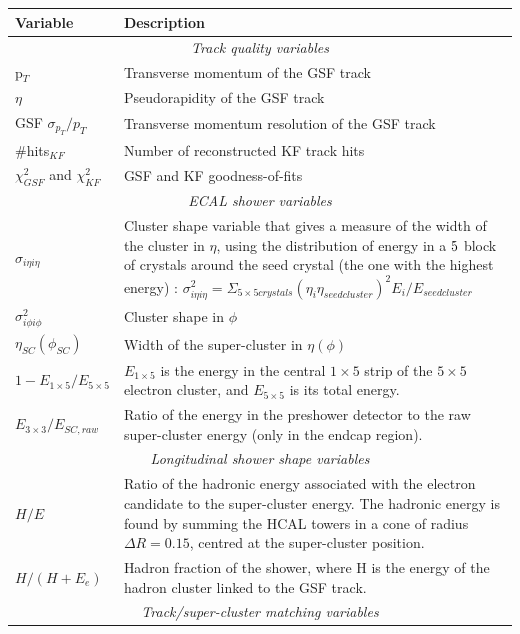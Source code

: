\begin{center} \label{tab-ElectronMVAID}
\begin{longtable}{|l|p{11cm}|}
\hline
	\textbf{Variable} & \textbf{Description} \\
\hline	
	\multicolumn{2}{|c|}{\emph{Track quality variables}}  \\
\hline
	p$_T$ & Transverse momentum of the GSF track \\
	$\eta$ & Pseudorapidity of the GSF track \\
	GSF $\sigma_{p_T}/p_T$ & Transverse momentum resolution of the GSF track \\
	\#hits$_{KF}$ & Number of reconstructed KF track hits \\
	$\chi^2_{GSF}$ and $\chi^2_{KF}$ & GSF and KF goodness-of-fits \\
\hline	
	\multicolumn{2}{|c|}{\emph{ECAL shower variables}} \\
\hline	
	$\sigma_{i \eta i \eta}$ & Cluster shape variable that gives a measure of the width of the cluster in $\eta$, using the distribution of energy in a $5 \time 5$ block of crystals around the seed crystal (the one with the highest energy) \cite{Baffioni:2006cd}: $\sigma^2_{i \eta i \eta} = \Sigma_{5 \times 5 crystals} (\eta_i \eta_{seed cluster})^2 E_i/E_{seed cluster}$ \\
	$\sigma^2_{i \phi i \phi}$ & Cluster shape in $\phi$ \\
	$\eta_{SC}(\phi_{SC})$ & Width of the super-cluster in $\eta (\phi)$ \\
	$1-E_{1 \times 5}/E_{5 \times 5}$ & $E_{1 \times 5}$ is the energy in the central $1 \times 5$ strip of the $5 \times 5$ electron cluster, and $E_{5 \times 5}$ is its total energy. \\
	$E_{3 \times 3}/E_{SC,raw}$ & Ratio of the energy in the preshower detector to the raw super-cluster energy (only in the endcap region). \\
\hline	
	\multicolumn{2}{|c|}{\emph{Longitudinal shower shape variables}} \\
\hline	
	$H/E$ & Ratio of the hadronic energy associated with the electron candidate to the super-cluster energy. The hadronic energy is found by summing the HCAL towers in a cone of radius $\Delta R = 0.15$, centred at the super-cluster position. \\
	$H/(H+E_{e})$ & Hadron fraction of the shower, where H is the energy of the hadron cluster linked to the GSF track.\\
\hline	
	\multicolumn{2}{|c|}{\emph{Track/super-cluster matching variables}}\\

\end{longtable}
\end{center}

